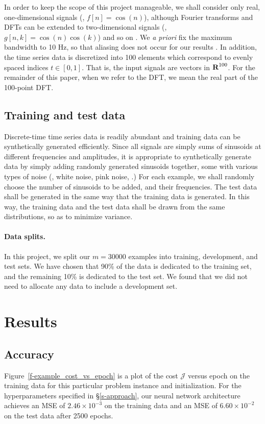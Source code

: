 \documentclass[12pt]{article}
\begin{document}
In order to keep the scope of this project manageable, we shall consider only real, one-dimensional 
signals (\eg, $f[n] = \cos(n)$), although Fourier transforms and DFTs can be extended to two-dimensional signals 
(\eg, $g[n,k] = \cos(n)\cos(k)$) and so on \cite{O:17}. 
We \emph{a priori} fix the maximum bandwidth to 10 Hz, 
so that aliasing does not occur for our results \cite{OS:99}. In addition, the time series data is discretized 
into 100 elements which correspond to evenly spaced indices $t \in [0,1]$. That is, the input signals are vectors in 
${\mbox{\bf R}}^{100}$. For the remainder of this paper, when we refer to the DFT, we mean the real part of the 
100-point DFT. 


\subsection{Training and test data} Discrete-time time series data is readily abundant and 
training data can be synthetically generated efficiently. Since all signals are simply sums of 
sinusoids at different frequencies and amplitudes, it is appropriate to synthetically generate
data by simply adding randomly generated sinusoids together, some with various types of noise 
(\eg, white noise, pink noise, \etc.) For each example, we shall randomly choose the number of 
sinusoids to be added, and their frequencies. The test data shall be generated in the same way that the 
training data is generated. In this way, the training data and the test data shall be drawn from the same 
distributions, so as to minimize variance.

\paragraph{Data splits.} In this project, we split our $m=30000$ examples into training, development, and test
sets. We have chosen that 90\% of the data is dedicated to the training set, and the remaining 10\% is 
dedicated to the test set. We found that we did not need to allocate any data to include a development set.

\section{Results} 
\subsection{Accuracy} 
Figure~\ref{f-example_cost_vs_epoch} is a plot of the cost $\mathcal J$ versus epoch on the training 
data for this particular problem instance and initialization. 
For the hyperparameters specified in \S\ref{s-approach}, our neural network architecture achieves an 
MSE of $2.46 \times 10^{-3}$ on the training data and an MSE of $6.60 \times 10^{-2}$ on the test data after 
2500 epochs.
\end{document}
